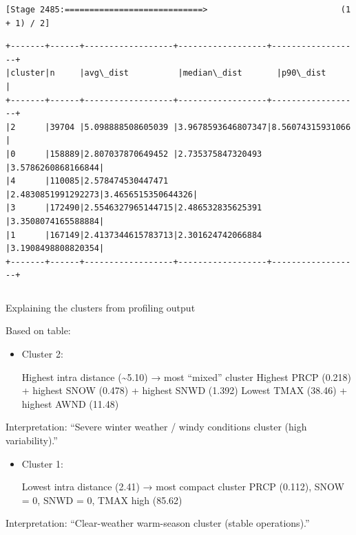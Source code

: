 \documentclass[11pt]{article}
\begin{document}
    \begin{Verbatim}[commandchars=\\\{\}]
[Stage 2485:============================>                           (1 + 1) / 2]
    \end{Verbatim}

    \begin{Verbatim}[commandchars=\\\{\}]
+-------+------+------------------+------------------+------------------+
|cluster|n     |avg\_dist          |median\_dist       |p90\_dist          |
+-------+------+------------------+------------------+------------------+
|2      |39704 |5.098888508605039 |3.9678593646807347|8.56074315931066  |
|0      |158889|2.807037870649452 |2.735375847320493 |3.5786260868166844|
|4      |110085|2.578474530447471 |2.4830851991292273|3.4656515350644326|
|3      |172490|2.5546327965144715|2.486532835625391 |3.3508074165588884|
|1      |167149|2.4137344615783713|2.301624742066884 |3.1908498808820354|
+-------+------+------------------+------------------+------------------+

    \end{Verbatim}

    \begin{Verbatim}[commandchars=\\\{\}]

    \end{Verbatim}

    Explaining the clusters from profiling output

    Based on table:

\begin{itemize}
\item
  Cluster 2:

  Highest intra distance (\textasciitilde5.10) → most ``mixed'' cluster
  Highest PRCP (0.218) + highest SNOW (0.478) + highest SNWD (1.392)
  Lowest TMAX (38.46) + highest AWND (11.48)
\end{itemize}

Interpretation: ``Severe winter weather / windy conditions cluster (high
variability).''

\begin{itemize}
\item
  Cluster 1:

  Lowest intra distance (2.41) → most compact cluster PRCP (0.112), SNOW
  = 0, SNWD = 0, TMAX high (85.62)
\end{itemize}

Interpretation: ``Clear-weather warm-season cluster (stable
operations).''
\end{document}
